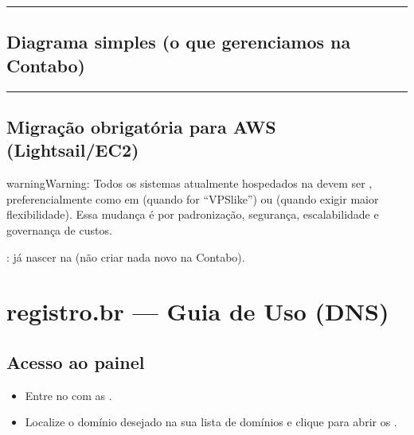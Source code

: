 \documentclass[letterpaper,10pt,brazil]{sphinxmanual}
\begin{document}
\bigskip\hrule\bigskip



\section{Diagrama simples (o que gerenciamos na Contabo)}
\label{\detokenize{sistemas/contabo:diagrama-simples-o-que-gerenciamos-na-contabo}}

\bigskip\hrule\bigskip



\section{Migração obrigatória para AWS (Lightsail/EC2)}
\label{\detokenize{sistemas/contabo:migracao-obrigatoria-para-aws-lightsail-ec2}}
\begin{sphinxadmonition}{warning}{Warning:}
\sphinxAtStartPar
Todos os sistemas atualmente hospedados na  devem ser , preferencialmente como  em  (quando for “VPS\sphinxhyphen{}like”) ou  (quando exigir maior flexibilidade). Essa mudança é  por padronização, segurança, escalabilidade e governança de custos.
\end{sphinxadmonition}

\sphinxAtStartPar
{}: já nascer na  (não criar nada novo na Contabo).

\sphinxstepscope


\chapter{registro.br — Guia de Uso (DNS)}
\label{\detokenize{sistemas/registrobr:registro-br-guia-de-uso-dns}}\label{\detokenize{sistemas/registrobr::doc}}

\section{Acesso ao painel}
\label{\detokenize{sistemas/registrobr:acesso-ao-painel}}\begin{itemize}
\item {} 
\sphinxAtStartPar
Entre no  com as .

\item {} 
\sphinxAtStartPar
Localize o domínio desejado na sua lista de domínios e clique para abrir os .

\end{itemize}
\end{document}
